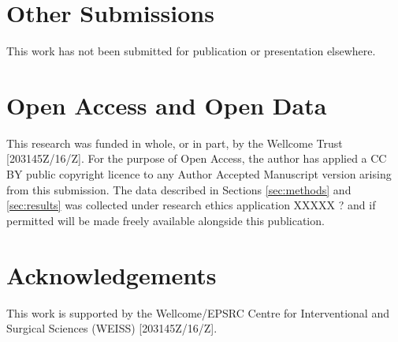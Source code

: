 \section{Other Submissions}
This work has not been submitted for publication or presentation elsewhere.

\section{Open Access and Open Data}
This research was funded in whole, or in part, by the Wellcome Trust [203145Z/16/Z]. 
For the purpose of Open Access, the author has applied a CC BY public copyright licence to any Author Accepted Manuscript version arising from this submission.
The data described in Sections \ref{sec:methods} and \ref{sec:results} was collected under
research ethics application XXXXX ? and if permitted will be made freely available alongside
this publication. 

\section{Acknowledgements}
This work is supported by the Wellcome/EPSRC Centre for Interventional and Surgical Sciences (WEISS) [203145Z/16/Z].


